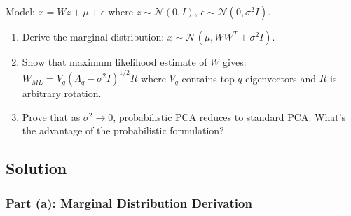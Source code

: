 \documentclass[12pt]{article}
\begin{document}
Model: \(x = Wz + \mu + \epsilon\) where \(z \sim \mathcal{N}(0, I)\), \(\epsilon \sim \mathcal{N}(0, \sigma^2I)\).

\begin{enumerate}
\item[(a)] Derive the marginal distribution: \(x \sim \mathcal{N}(\mu, WW^T + \sigma^2I)\).
\item[(b)] Show that maximum likelihood estimate of \(W\) gives: \(W_{ML} = V_q(\Lambda_q - \sigma^2I)^{1/2}R\) where \(V_q\) contains top \(q\) eigenvectors and \(R\) is arbitrary rotation.
\item[(c)] Prove that as \(\sigma^2 \to 0\), probabilistic PCA reduces to standard PCA. What's the advantage of the probabilistic formulation?
\end{enumerate}

\subsection{Solution}

\subsubsection{Part (a): Marginal Distribution Derivation}
\end{document}
